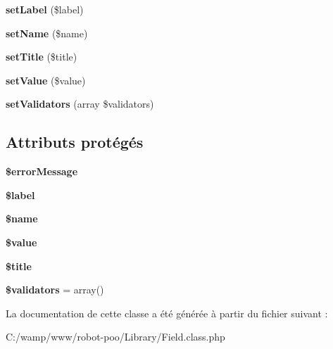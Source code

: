 \begin{DoxyCompactItemize}
\item 
\hypertarget{class_library_1_1_field_aff9dc1c7a22e2b4168647651480e586a}{{\bfseries set\+Label} (\$label)}\label{class_library_1_1_field_aff9dc1c7a22e2b4168647651480e586a}

\item 
\hypertarget{class_library_1_1_field_a2fe666694997d047711d7653eca2f132}{{\bfseries set\+Name} (\$name)}\label{class_library_1_1_field_a2fe666694997d047711d7653eca2f132}

\item 
\hypertarget{class_library_1_1_field_a884ba9bb0d54bde7839e798db7964476}{{\bfseries set\+Title} (\$title)}\label{class_library_1_1_field_a884ba9bb0d54bde7839e798db7964476}

\item 
\hypertarget{class_library_1_1_field_a7494441b6ed08a391704971873f31432}{{\bfseries set\+Value} (\$value)}\label{class_library_1_1_field_a7494441b6ed08a391704971873f31432}

\item 
\hypertarget{class_library_1_1_field_aca29eb259f50ad35d2e67cb346456403}{{\bfseries set\+Validators} (array \$validators)}\label{class_library_1_1_field_aca29eb259f50ad35d2e67cb346456403}

\end{DoxyCompactItemize}
\subsection*{Attributs protégés}
\begin{DoxyCompactItemize}
\item 
\hypertarget{class_library_1_1_field_a25b5b4c70be7dd968b64cb57e5f9565d}{{\bfseries \$error\+Message}}\label{class_library_1_1_field_a25b5b4c70be7dd968b64cb57e5f9565d}

\item 
\hypertarget{class_library_1_1_field_a177af2bf70bede02de3d05a425fb8e43}{{\bfseries \$label}}\label{class_library_1_1_field_a177af2bf70bede02de3d05a425fb8e43}

\item 
\hypertarget{class_library_1_1_field_ab2fc40d43824ea3e1ce5d86dee0d763b}{{\bfseries \$name}}\label{class_library_1_1_field_ab2fc40d43824ea3e1ce5d86dee0d763b}

\item 
\hypertarget{class_library_1_1_field_a0f298096f322952a72a50f98a74c7b60}{{\bfseries \$value}}\label{class_library_1_1_field_a0f298096f322952a72a50f98a74c7b60}

\item 
\hypertarget{class_library_1_1_field_ada57e7bb7c152edad18fe2f166188691}{{\bfseries \$title}}\label{class_library_1_1_field_ada57e7bb7c152edad18fe2f166188691}

\item 
\hypertarget{class_library_1_1_field_a92dc1d646f00c393e2ed76a7ec06e76b}{{\bfseries \$validators} = array()}\label{class_library_1_1_field_a92dc1d646f00c393e2ed76a7ec06e76b}

\end{DoxyCompactItemize}


La documentation de cette classe a été générée à partir du fichier suivant \+:\begin{DoxyCompactItemize}
\item 
C\+:/wamp/www/robot-\/poo/\+Library/Field.\+class.\+php\end{DoxyCompactItemize}
